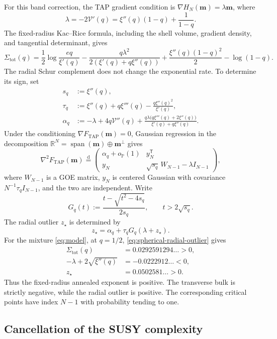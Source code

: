 \documentclass[a4paper,10pt,reqno]{amsart}
\numberwithin{equation}{section}
\newcommand{\dR}{\mathbb{R}}%
\newcommand{\dP}{\mathbb{P}}%
\newcommand{\TAP}{\mathrm{TAP}}
\newcommand{\bfm}{\mathbf{m}}
\begin{document}
	For this band correction, the TAP gradient condition is
	\(\nabla H_N(\bfm)=\lambda\bfm\), where
	\[
	\lambda=-2\mathcal V'(q)
	=\xi''(q)(1-q)+\frac1{1-q}.
	\]
	The fixed-radius Kac--Rice formula, including the shell volume, gradient
	density, and tangential determinant, gives
	\[
	\Sigma_{\mathrm{tot}}(q)
	=\frac12\log\frac{eq}{\xi'(q)}
	-
	\frac{q\lambda^2}{2(\xi'(q)+q\xi''(q))}
	+\frac{\xi''(q)(1-q)^2}{2}
	-\log(1-q).
	\]
	The radial Schur complement does not change the exponential rate. To
	determine its sign, set
	\[
	\begin{aligned}
		s_q&:=\xi''(q),\\
		\tau_q
		&:=
		\xi''(q)+q\xi'''(q)
		-\frac{q\xi''(q)^2}{\xi'(q)},\\
		\alpha_q
		&:=
		-\lambda+4q\mathcal V''(q)
		+
		\frac{
			q\lambda\bigl(q\xi'''(q)+2\xi''(q)\bigr)
		}{
			\xi'(q)+q\xi''(q)
		}.
	\end{aligned}
	\]
	Under the conditioning \(\nabla F_{\TAP}(\bfm)=0\), Gaussian regression in
	the decomposition
	\(\dR^N=\operatorname{span}(\bfm)\oplus\bfm^\perp\) gives
	\[
	\nabla^2F_{\TAP}(\bfm)
	\stackrel{\mathrm d}=
	\begin{pmatrix}
		\alpha_q+o_{\dP}(1)&y_N^{\mathsf T}\\
		y_N&\sqrt{s_q}\,W_{N-1}-\lambda I_{N-1}
	\end{pmatrix},
	\]
	where \(W_{N-1}\) is a GOE matrix, \(y_N\) is centered Gaussian with
	covariance \(N^{-1}\tau_qI_{N-1}\), and the two are independent. Write
	\[
	G_q(t):=\frac{t-\sqrt{t^2-4s_q}}{2s_q},
	\qquad t>2\sqrt{s_q}.
	\]
	The radial outlier \(z_\star\) is determined by
	\begin{equation}\label{eq:spherical-radial-outlier}
		z_\star
		=
		\alpha_q+\tau_qG_q(\lambda+z_\star).
	\end{equation}
	For the mixture \eqref{eq:model}, at \(q=1/2\),
	\eqref{eq:spherical-radial-outlier} gives
	\begin{align*}
		\Sigma_{\mathrm{tot}}(q)
		&=0.0292591294\ldots>0,\\
		-\lambda+2\sqrt{\xi''(q)}
		&=-0.0222912\ldots<0,\\
		z_\star
		&=0.0502581\ldots>0.
	\end{align*}
	Thus the fixed-radius annealed exponent is positive. The transverse bulk is
	strictly negative, while the radial outlier is positive. The corresponding
	critical points have index \(N-1\) with probability tending to one.
	
	\subsection{Cancellation of the SUSY complexity}
	
\end{document}
